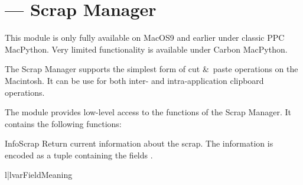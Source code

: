 \section{ --- Scrap Manager}


This module is only fully available on MacOS9 and earlier under
classic PPC MacPython.  Very limited functionality is available under
Carbon MacPython.

The Scrap Manager supports the simplest form of
cut \&\ paste operations on the Macintosh.  It can be use for both
inter- and intra-application clipboard operations.

The  module provides low-level access to the functions
of the Scrap Manager.  It contains the following functions:


\begin{funcdesc}{InfoScrap}{}
  Return current information about the scrap.  The information is
  encoded as a tuple containing the fields .

  \begin{tableii}{l|l}{var}{Field}{Meaning}
  \end{tableii}
\end{funcdesc}



\begin{seealso}
\end{seealso}
